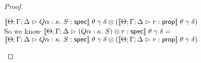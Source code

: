 \begin{proof}
\begin{itemize}
\begin{tabbedproof}
        \oox $\Frame{\interp{\judgeS{Q \alpha:\kappa.\;S}}\;\theta\;\gamma\;\delta}{(\interp{\judgeA{r}{\assert}}\;\theta\;\gamma\;\delta)}$ \\
        \oo So we know $\interp{\judgeS{\Frame{(Q \alpha:\kappa.\; S)}{r}}}\;\theta\;\gamma\;\delta = $ \\
        \oox $\Frame{\interp{\judgeS{Q \alpha:\kappa.\;S}}\;\theta\;\gamma\;\delta}{(\interp{\judgeA{r}{\assert}}\;\theta\;\gamma\;\delta)}$ \\        
      \end{tabbedproof}
  \end{itemize}
\end{proof}




